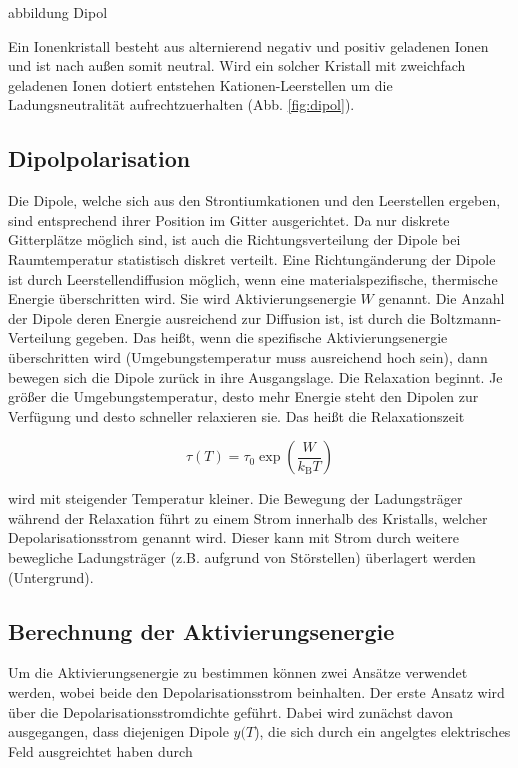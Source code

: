 abbildung Dipol

Ein Ionenkristall besteht aus alternierend negativ und positiv geladenen Ionen und ist nach außen somit neutral.
Wird ein solcher Kristall mit zweichfach geladenen Ionen dotiert entstehen Kationen-Leerstellen um die Ladungsneutralität aufrechtzuerhalten (Abb. \ref{fig:dipol}). 


\subsection{Dipolpolarisation}
\label{sec:Dipolpolarisation}

Die Dipole, welche sich aus den Strontiumkationen und den Leerstellen ergeben, 
sind entsprechend ihrer Position im Gitter ausgerichtet. Da nur diskrete 
Gitterplätze möglich sind, ist auch die Richtungsverteilung der Dipole bei 
Raumtemperatur statistisch diskret verteilt. Eine Richtungänderung der 
Dipole ist durch Leerstellendiffusion möglich, wenn eine materialspezifische, 
thermische Energie überschritten wird. Sie wird Aktivierungsenergie $W$ genannt. 
Die Anzahl der Dipole deren Energie ausreichend zur Diffusion ist, ist durch die 
Boltzmann-Verteilung gegeben. Das heißt, wenn die spezifische Aktivierungsenergie 
überschritten wird  (Umgebungstemperatur muss ausreichend hoch sein), dann bewegen sich 
die Dipole zurück in ihre Ausgangslage. Die Relaxation beginnt. 
Je größer die Umgebungstemperatur, desto mehr Energie steht den Dipolen zur Verfügung 
und desto schneller relaxieren sie. Das heißt die Relaxationszeit 

\begin{equation}
    \tau(T) = \tau_0 \exp{\left(\frac{W}{k_\text{B}T}\right)}
    \label{eq1}
\end{equation}

wird mit steigender Temperatur kleiner. Die Bewegung der Ladungsträger während der 
Relaxation führt zu einem Strom innerhalb des Kristalls, welcher 
Depolarisationsstrom genannt wird. Dieser kann mit Strom durch
weitere bewegliche Ladungsträger (z.B. aufgrund von Störstellen) überlagert werden
(Untergrund).


\subsection{Berechnung der Aktivierungsenergie}
\label{sec:Aktivierungsenergie}

Um die Aktivierungsenergie zu bestimmen können zwei Ansätze verwendet werden,
wobei beide den Depolarisationsstrom beinhalten.
Der erste Ansatz wird über die Depolarisationsstromdichte
geführt. Dabei wird zunächst davon ausgegangen, dass diejenigen Dipole $y(T$), die 
sich durch ein angelgtes elektrisches Feld ausgreichtet haben durch 

